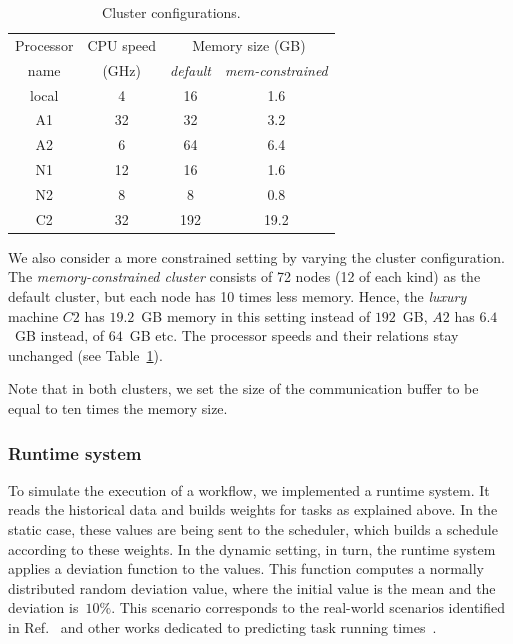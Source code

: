 \documentclass[conference]{IEEEtran}
\begin{document}
\begin{table}[tb]
    \begin{center}
        \begin{tabular}{c|c|cc}
            \toprule
            Processor  %
            &  CPU speed   & \multicolumn{2}{c}{Memory size (GB)} \\
            name & (GHz) & {\em default} & {\em mem-constrained} \\
            \midrule
            local                    & 4                    & 16     & 1.6 \\
            A1                      & 32                   & 32     & 3.2 \\
            A2                      & 6                    & 64    & 6.4 \\
            N1                      & 12                   & 16     & 1.6 \\
            N2                      & 8                    & 8      & 0.8\\
            C2                      & 32                   & 192   &  19.2\\
            \bottomrule
        \end{tabular}
    \end{center}
    \caption{Cluster configurations.}
    \label{tab:procs}
\end{table}

We also consider a more constrained setting by varying the cluster configuration. 
The {\em memory-constrained cluster} consists of 72 nodes (12 of each kind) as the default cluster,
but each node has 10 times less memory. Hence,  
the {\em luxury} machine $C2$ has $19.2$~GB memory in this setting instead of $192$~GB, 
$A2$ has $6.4$~GB instead, of $64$~GB etc.
The processor speeds and their relations stay unchanged (see Table~\ref{tab:procs}).

Note that in both clusters, we set the size of the communication buffer to be equal
to ten times the memory size.


\subsubsection{Runtime system}
\label{ss:runtime-sys}
%
To simulate the execution of a workflow, we implemented a runtime system.
It reads the historical data and builds weights for tasks as explained above.
In the static case, these values are being sent to the scheduler, which builds a schedule
according to these weights.
In the dynamic setting, in turn, the runtime system applies a deviation function to the values.
This function computes a normally distributed random deviation value, where the initial value
is the mean and the deviation is~$10\%$.
This scenario corresponds to the real-world scenarios identified in Ref.~\cite{lotaru} and
other works dedicated to predicting task running times~\cite{da2015online,da2013toward}.
\end{document}
